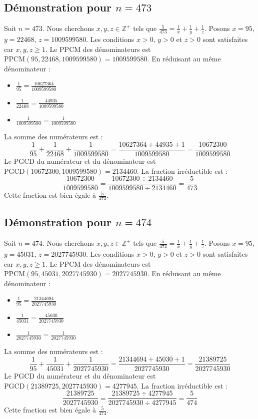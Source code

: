 \documentclass[11pt,a4paper]{article}
\begin{document}
\subsection{Démonstration pour $n = 473$}
Soit $n = 473$. Nous cherchons $x, y, z \in \mathbb{Z}^{+}$ tels que $\frac{5}{473} = \frac{1}{x} + \frac{1}{y} + \frac{1}{z}$.
Posons $x = 95$, $y = 22468$, $z = 1009599580$.
Les conditions $x > 0$, $y > 0$ et $z > 0$ sont satisfaites car $x, y, z \geq 1$.
Le PPCM des dénominateurs est $\text{PPCM}(95, 22468, 1009599580) = 1009599580$.
En réduisant au même dénominateur :
\begin{itemize}
    \item $\frac{1}{95} = \frac{10627364}{1009599580}$
    \item $\frac{1}{22468} = \frac{44935}{1009599580}$
    \item $\frac{1}{1009599580} = \frac{1}{1009599580}$
\end{itemize}
La somme des numérateurs est :
$$ \frac{1}{95} + \frac{1}{22468} + \frac{1}{1009599580} = \frac{10627364 + 44935 + 1}{1009599580} = \frac{10672300}{1009599580} $$
Le PGCD du numérateur et du dénominateur est $\text{PGCD}(10672300, 1009599580) = 2134460$.
La fraction irréductible est :
$$ \frac{10672300}{1009599580} = \frac{10672300 \div 2134460}{1009599580 \div 2134460} = \frac{5}{473} $$
Cette fraction est bien égale à $\frac{5}{473}$.

\subsection{Démonstration pour $n = 474$}
Soit $n = 474$. Nous cherchons $x, y, z \in \mathbb{Z}^{+}$ tels que $\frac{5}{474} = \frac{1}{x} + \frac{1}{y} + \frac{1}{z}$.
Posons $x = 95$, $y = 45031$, $z = 2027745930$.
Les conditions $x > 0$, $y > 0$ et $z > 0$ sont satisfaites car $x, y, z \geq 1$.
Le PPCM des dénominateurs est $\text{PPCM}(95, 45031, 2027745930) = 2027745930$.
En réduisant au même dénominateur :
\begin{itemize}
    \item $\frac{1}{95} = \frac{21344694}{2027745930}$
    \item $\frac{1}{45031} = \frac{45030}{2027745930}$
    \item $\frac{1}{2027745930} = \frac{1}{2027745930}$
\end{itemize}
La somme des numérateurs est :
$$ \frac{1}{95} + \frac{1}{45031} + \frac{1}{2027745930} = \frac{21344694 + 45030 + 1}{2027745930} = \frac{21389725}{2027745930} $$
Le PGCD du numérateur et du dénominateur est $\text{PGCD}(21389725, 2027745930) = 4277945$.
La fraction irréductible est :
$$ \frac{21389725}{2027745930} = \frac{21389725 \div 4277945}{2027745930 \div 4277945} = \frac{5}{474} $$
Cette fraction est bien égale à $\frac{5}{474}$.
\end{document}
